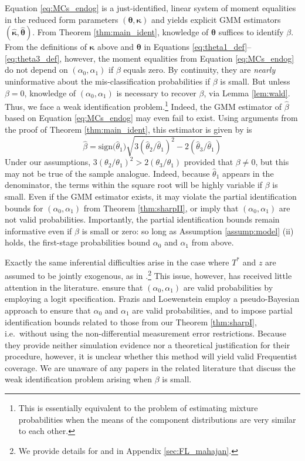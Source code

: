 Equation \ref{eq:MCs_endog} is a just-identified, linear system of moment equalities in the reduced form parameters $(\boldsymbol{\theta},\boldsymbol{\kappa})$ and yields explicit GMM estimators $(\widehat{\boldsymbol{\kappa}},\widehat{\boldsymbol{\theta}})$.
From Theorem \ref{thm:main_ident}, knowledge of $\boldsymbol{\theta}$ suffices to identify $\beta$.
From the definitions of $\boldsymbol{\kappa}$ above and $\boldsymbol{\theta}$  in Equations \ref{eq:theta1_def}--\ref{eq:theta3_def}, however, the moment equalities from Equation \ref{eq:MCs_endog} do not depend on $(\alpha_0, \alpha_1)$ if $\beta$ equals zero.
By continuity, they are \emph{nearly} uninformative about the mis-classification probabilities if $\beta$ is small.
But unless $\beta = 0$, knowledge of $(\alpha_0, \alpha_1)$ is necessary to recover $\beta$, via Lemma \ref{lem:wald}. 
Thus, we face a weak identification problem.\footnote{This is essentially equivalent to the problem of estimating mixture probabilities when the means of the component distributions are very similar to each other.}
Indeed, the GMM estimator of $\widehat{\beta}$ based on Equation \ref{eq:MCs_endog} may even fail to exist.
Using arguments from the proof of Theorem \ref{thm:main_ident}, this estimator is given by is
\[
  \widehat{\beta} = \mbox{sign}\big(\widehat{\theta}_1\big) \sqrt{3\left( \widehat{\theta}_2/\widehat{\theta}_1 \right)^2 - 2 \left(\widehat{\theta}_3/\widehat{\theta}_1 \right)}
\]
Under our assumptions, $3(\theta_2/\theta_1)^2 > 2 (\theta_3/\theta_1)$ provided that $\beta \neq 0$, but this may not be true of the sample analogue.
Indeed, because $\widehat{\theta}_1$ appears in the denominator, the terms within the square root will be highly variable if $\beta$ is small.
Even if the GMM estimator exists, it may violate the partial identification bounds for $(\alpha_0, \alpha_1)$ from Theorem \ref{thm:sharpII}, or imply that $(\alpha_0,\alpha_1)$ are not valid probabilities. 
Importantly, the partial identification bounds remain informative even if $\beta$ is small or zero: so long as Assumption \ref{assump:model} (ii) holds, the first-stage probabilities bound $\alpha_0$ and $\alpha_1$ from above.


Exactly the same inferential difficulties arise in the case where $T^*$ and $z$ are assumed to be jointly exogenous, as in \cite{KRS,BBS,FL,Mahajan,Lewbel}.\footnote{We provide details for \cite{FL} and \cite{Mahajan} in Appendix \ref{sec:FL_mahajan}.}
This issue, however, has received little attention in the literature. 
\cite{KRS} ensure that $(\alpha_0, \alpha_1)$ are valid probabilities by employing a logit specification.
Frazis and Loewenstein employ a pseudo-Bayesian approach to ensure that $\alpha_0$ and $\alpha_1$ are valid probabilities, and to impose partial identification bounds related to those from our Theorem \ref{thm:sharpI}, i.e.\ without using the non-differential measurement error restrictions.
Because they provide neither simulation evidence nor a theoretical justification for their procedure, however, it is unclear whether this method will yield valid Frequentist coverage.
We are unaware of any papers in the related literature that discuss the weak identification problem arising when $\beta$ is small.


